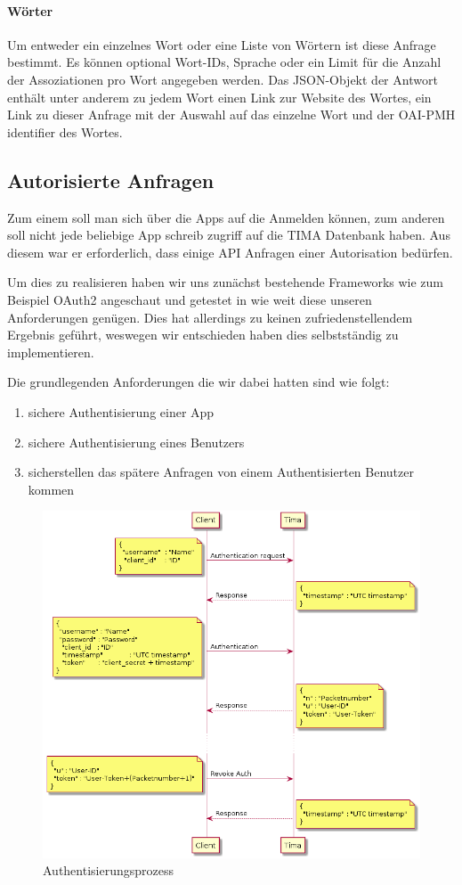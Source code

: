 \paragraph{Wörter} Um entweder ein einzelnes Wort oder eine Liste von Wörtern ist diese Anfrage bestimmt. Es können optional Wort-IDs, Sprache oder ein Limit für die Anzahl der Assoziationen pro Wort angegeben werden. Das JSON-Objekt der Antwort enthält unter anderem zu jedem Wort einen Link zur Website des Wortes, ein Link zu dieser Anfrage mit der Auswahl auf das einzelne Wort und der OAI-PMH identifier des Wortes.

\subsection{Autorisierte Anfragen}
Zum einem soll man sich über die Apps auf die Anmelden können, zum anderen soll nicht jede beliebige App schreib zugriff auf die TIMA Datenbank haben. Aus diesem war er erforderlich, dass einige API Anfragen einer Autorisation bedürfen.

Um dies zu realisieren haben wir uns zunächst bestehende Frameworks wie zum Beispiel OAuth2 angeschaut und getestet in wie weit diese unseren Anforderungen genügen. Dies hat allerdings zu keinen zufriedenstellendem Ergebnis geführt, weswegen wir entschieden haben dies selbstständig zu implementieren.

Die grundlegenden Anforderungen die wir dabei hatten sind wie folgt:
\begin{enumerate}
	\item sichere Authentisierung einer App
	\item sichere Authentisierung eines Benutzers
	\item sicherstellen das spätere Anfragen von einem Authentisierten Benutzer kommen
\end{enumerate}

\begin{figure}
	\centering
	\includegraphics[width=\textwidth]{images/auth.png}
	\caption{Authentisierungsprozess}
	\label{fig:auth}
\end{figure}

